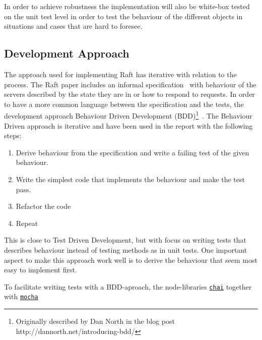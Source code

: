 In order to achieve robustness the implementation will also be white-box tested on the unit test level in order to test the behaviour of the different objects in situations and cases that are hard to foresee.


\subsection{Development Approach}
\label{sub:development_approach}

The approach used for implementing Raft has iterative with relation to the process. The Raft paper includes an informal specification~\cite[page~4]{Raft} with behaviour of the servers described by the state they are in or how to respond to requests. In order to have a more common language between the specification and the tests, the development approach Behaviour Driven Development (BDD)\footnote{Originally described by Dan North in the blog post http://dannorth.net/introducing-bdd/}~\cite{bddpaper}. The Behaviour Driven approach is iterative and have been used in the report with the following steps:

\begin{enumerate}
    \item Derive behaviour from the specification and write a failing test of the given behaviour.
    \item Write the simplest code that implements the behaviour and make the test pass.
    \item Refactor the code
    \item Repeat
\end{enumerate}

This is close to Test Driven Development, but with focus on writing tests that describes behaviour instead of testing methods as in unit tests.
One important aspect to make this approach work well is to derive the behaviour that seem most easy to implement first.

To facilitate writing tests with a BDD-aproach, the node-libraries \href{http://chaijs.com/}{\tt chai} together with \href{http://mochajs.org}{\tt mocha} 

